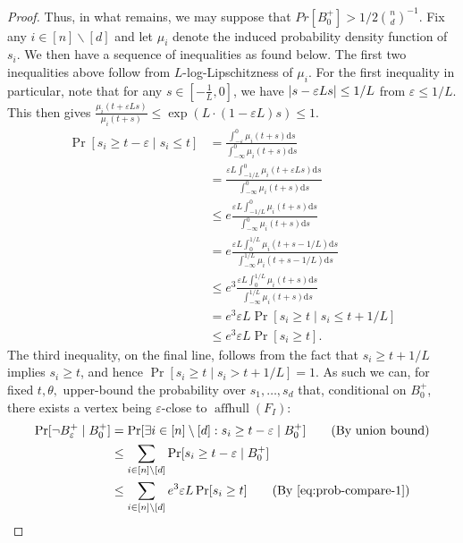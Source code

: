\documentclass{theoretics}
\newcommand{\aff}{\operatorname{affhull}}
\newcommand{\eps}{\varepsilon} %
\renewcommand{\epsilon}{\varepsilon} %
\DeclarePairedDelimiter\abs{\lvert}{\rvert}
\begin{document}
\begin{proof}
    Thus, in what remains, we may suppose that $Pr[B_{0}^{+}] > 1/2 \binom{n}{d}^{-1}$.
    Fix any $i \in [n] \backslash [d]$ and let $\mu_i$ denote the induced probability density function of $s_i$. We then have a sequence of inequalities as found below.    
    The first two inequalities above follow from $L$-log-Lipschitzness of $\mu_i$. 
    For the first inequality in particular, note that for any $s \in [-\frac{1}{L}, 0]$,
    we have $\abs{s-\eps L s} \leq 1/L$ from $\eps \leq 1/L$.
    This then gives $\frac{\mu_i (t + \epsilon L s)}{\mu_i (t + s)} \leq \exp(L \cdot (1 - \epsilon L) s) \leq 1$.
    \begin{align}
        \Pr[ s_i \geq t - \eps \mid s_i \leq t]
        &= \frac{\int_{-\eps}^0 \mu_i(t + s) \mathrm d s}{\int_{-\infty}^0 \mu_i(t + s) \mathrm d s} \nonumber\\
        &= \frac{\eps L \int_{-1/L}^0 \mu_i(t + \eps L s) \mathrm d s}{\int_{-\infty}^0 \mu_i(t + s) \mathrm d s} \nonumber\\
        &\leq e \frac{\eps L \int_{-1/L}^0 \mu_i(t + s) \mathrm d s}{\int_{-\infty}^0 \mu_i(t + s) \mathrm d s}\nonumber \\
        &= e \frac{\eps L \int_{0}^{1/L} \mu_i(t + s - 1/L) \mathrm d s}{\int_{-\infty}^{1/L} \mu_i(t + s - 1/L) \mathrm d s}\nonumber \\
        &\leq e^3 \frac{\eps L \int_{0}^{1/L} \mu_i(t + s) \mathrm d s}{\int_{-\infty}^{1/L} \mu_i(t + s) \mathrm d s} \nonumber\\
        &= e^3 \eps L \Pr[s_i \geq t \mid s_i \leq t + 1/L] \nonumber\\
        &\leq e^3 \eps L \Pr[s_i \geq t]. \label{eq:prob-compare-1}
    \end{align}
    The third inequality, on the final line, follows from the fact that $s_i \geq t + 1/L$ implies $s_i \geq t$,
    and hence $\Pr[s_i \geq t \mid s_i > t+1/L] = 1$.
    As such we can, for fixed $t,\theta,$ upper-bound the probability over $s_1,\dots,s_d$ that,
    conditional on $B_0^+$, there exists a vertex being $\epsilon$-close to $\aff(F_I)$:
    \begin{align}
        \Pr[\neg B_\eps^+\mid B_0^+]
    &= \Pr[\exists i \in [n]\setminus [d] : s_i \geq t - \eps \mid B_0^+] \nonumber \tag{By union bound} \\
    &\leq \sum_{i \in [n] \setminus [d]} \Pr[s_i \geq t - \eps \mid B_0^+] \nonumber \\
    &\leq \sum_{i \in [n] \setminus [d]} e^3 \eps L \Pr[s_i \geq t ] \tag{By \eqref{eq:prob-compare-1}} \nonumber \\

\end{align}
\end{proof}
\end{document}
